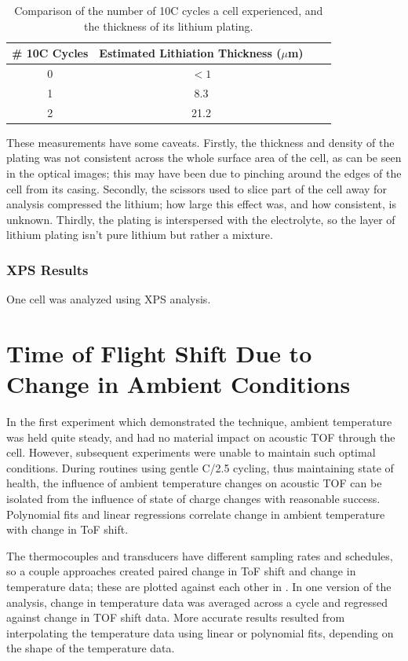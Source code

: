 \begin{table}[h]
    \centering
    \begin{tabular}{c|c|c|c}
         \# 10C Cycles & Estimated Lithiation Thickness ($\mu$m) \\
         \hline
         0 & $<1$ \\
         1 & 8.3 \\
         2 & 21.2 \\
    \end{tabular}
    \caption{Comparison of the number of 10C cycles a cell experienced, and the thickness of its lithium plating.}
    \label{tab:plating}
\end{table}

These measurements have some caveats. 
Firstly, the thickness and density of the plating was not consistent across the whole surface area of the cell, as can be seen in the optical images; this may have been due to pinching around the edges of the cell from its casing.
Secondly, the scissors used to slice part of the cell away for analysis compressed the lithium; how large this effect was, and how consistent, is unknown. 
Thirdly, the plating is interspersed with the electrolyte, so the layer of lithium plating isn't pure lithium but rather a mixture.


\subsubsection{XPS Results}
One cell was analyzed using XPS analysis.


\section{Time of Flight Shift Due to Change in Ambient Conditions}
In the first experiment which demonstrated the technique, ambient temperature was held quite steady, and had no material impact on acoustic TOF through the cell. 
However, subsequent experiments were unable to maintain such optimal conditions.
During routines using gentle C/2.5 cycling, thus maintaining state of health, the influence of ambient temperature changes on acoustic TOF can be isolated from the influence of state of charge changes with reasonable success. 
Polynomial fits and linear regressions correlate change in ambient temperature with change in ToF shift. 

The thermocouples and transducers have different sampling rates and schedules, so a couple approaches created paired change in ToF shift and change in temperature data; these are plotted against each other in . 
In one version of the analysis, change in temperature data was averaged across a cycle and regressed against change in TOF shift data. 
More accurate results resulted from interpolating the temperature data using linear or polynomial fits, depending on the shape of the temperature data.

